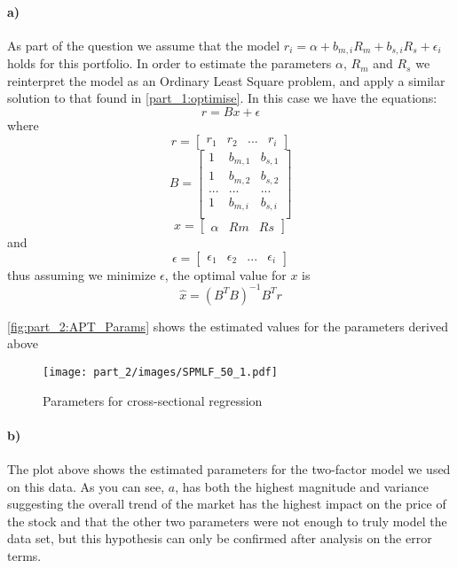 \paragraph{a)} As part of the question we assume that the model $r_i = \alpha + b_{m,i}R_m + b_{s,i}R_s + \epsilon_i$ holds for this portfolio. In order to estimate the parameters $\alpha$, $R_m$ and $R_s$ we reinterpret the model as an Ordinary Least Square problem, and apply a similar solution to that found in \autoref{part_1:optimise}. In this case we have the equations:
\[r = Bx + \epsilon\] where  
\[r = \begin{bmatrix} r_1 & r_2 & ... & r_i \end{bmatrix}\]  
\[B = \begin{bmatrix} 1 & b_{m,1} & b_{s,1} \\ 
                     1 & b_{m,2} & b_{s,2} \\ 
                     ... & ... & ...  \\
                     1 & b_{m,i} & b_{s,i} \\ 
\end{bmatrix}\] 
\[x= \begin{bmatrix} \alpha & Rm & Rs \end{bmatrix}\] and  
\[ \epsilon = \begin{bmatrix} \epsilon_1 & \epsilon_2 & ... & \epsilon_i \end{bmatrix}\] 
thus assuming we minimize $\epsilon$, the optimal value for $x$ is \[\hat{x} = (B^TB)^{-1}B^Tr\]

\autoref{fig:part_2:APT_Params} shows the estimated values for the parameters derived above

\begin{figure}[!htb]
    \centering
    \texttt{[image: part\_2/images/SPMLF\_50\_1.pdf]}
    \caption{Parameters for cross-sectional regression}
    \label{fig:part_2:APT_Params}
\end{figure}

\paragraph{b)} The plot above shows the estimated parameters for the two-factor model we used on this data. As you can see, $a$, has both the highest magnitude and variance suggesting the overall trend of the market has the highest impact on the price of the stock and that the other two parameters were not enough to truly model the data set, but this hypothesis can only be confirmed after analysis on the error terms.

